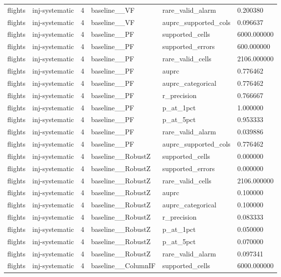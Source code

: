 \begin{tabular}{llllll}
flights & inj-systematic & 4 & baseline\_\_VF & rare\_valid\_alarm & 0.200380 \\
flights & inj-systematic & 4 & baseline\_\_VF & auprc\_supported\_cols & 0.096637 \\
flights & inj-systematic & 4 & baseline\_\_PF & supported\_cells & 6000.000000 \\
flights & inj-systematic & 4 & baseline\_\_PF & supported\_errors & 600.000000 \\
flights & inj-systematic & 4 & baseline\_\_PF & rare\_valid\_cells & 2106.000000 \\
flights & inj-systematic & 4 & baseline\_\_PF & auprc & 0.776462 \\
flights & inj-systematic & 4 & baseline\_\_PF & auprc\_categorical & 0.776462 \\
flights & inj-systematic & 4 & baseline\_\_PF & r\_precision & 0.766667 \\
flights & inj-systematic & 4 & baseline\_\_PF & p\_at\_1pct & 1.000000 \\
flights & inj-systematic & 4 & baseline\_\_PF & p\_at\_5pct & 0.953333 \\
flights & inj-systematic & 4 & baseline\_\_PF & rare\_valid\_alarm & 0.039886 \\
flights & inj-systematic & 4 & baseline\_\_PF & auprc\_supported\_cols & 0.776462 \\
flights & inj-systematic & 4 & baseline\_\_RobustZ & supported\_cells & 0.000000 \\
flights & inj-systematic & 4 & baseline\_\_RobustZ & supported\_errors & 0.000000 \\
flights & inj-systematic & 4 & baseline\_\_RobustZ & rare\_valid\_cells & 2106.000000 \\
flights & inj-systematic & 4 & baseline\_\_RobustZ & auprc & 0.100000 \\
flights & inj-systematic & 4 & baseline\_\_RobustZ & auprc\_categorical & 0.100000 \\
flights & inj-systematic & 4 & baseline\_\_RobustZ & r\_precision & 0.083333 \\
flights & inj-systematic & 4 & baseline\_\_RobustZ & p\_at\_1pct & 0.050000 \\
flights & inj-systematic & 4 & baseline\_\_RobustZ & p\_at\_5pct & 0.070000 \\
flights & inj-systematic & 4 & baseline\_\_RobustZ & rare\_valid\_alarm & 0.097341 \\
flights & inj-systematic & 4 & baseline\_\_ColumnIF & supported\_cells & 6000.000000 \\

\end{tabular}
